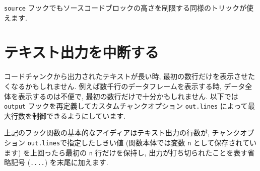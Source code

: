 \documentclass[
  11pt,
]{bxjsreport}
\newenvironment{Shaded}{\begin{snugshade}}{\end{snugshade}}
\newcommand{\AttributeTok}[1]{\textcolor[rgb]{0.77,0.63,0.00}{#1}}
\newcommand{\CommentTok}[1]{\textcolor[rgb]{0.56,0.35,0.01}{\textit{#1}}}
\newcommand{\ControlFlowTok}[1]{\textcolor[rgb]{0.13,0.29,0.53}{\textbf{#1}}}
\newcommand{\FunctionTok}[1]{\textcolor[rgb]{0.00,0.00,0.00}{#1}}
\newcommand{\NormalTok}[1]{#1}
\newcommand{\OtherTok}[1]{\textcolor[rgb]{0.56,0.35,0.01}{#1}}
\newcommand{\SpecialCharTok}[1]{\textcolor[rgb]{0.00,0.00,0.00}{#1}}
\newcommand{\StringTok}[1]{\textcolor[rgb]{0.31,0.60,0.02}{#1}}
\begin{document}
\texttt{source} フックでもソースコードブロックの高さを制限する同様のトリックが使えます.

\hypertarget{hook-truncate}{%
\section{テキスト出力を中断する}\label{hook-truncate}}

コードチャンクから出力されたテキストが長い時, 最初の数行だけを表示させたくなるかもしれません. 例えば数千行のデータフレームを表示する時, データ全体を表示するのは不便で, 最初の数行だけで十分かもしれません. 以下では \texttt{output} フックを再定義してカスタムチャンクオプション \texttt{out.lines} によって最大行数を制御できるようにしています.

\begin{Shaded}
\end{Shaded}

上記のフック関数の基本的なアイディアはテキスト出力の行数が, チャンクオプション \texttt{out.lines}で指定したしきい値 (関数本体では変数 \texttt{n} として保存されています) を上回ったら最初の \texttt{n} 行だけを保持し, 出力が打ち切られたことを表す省略記号 (\texttt{....}) を末尾に加えます.
\end{document}
